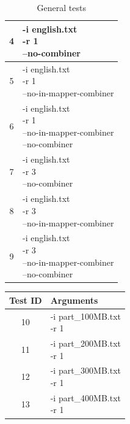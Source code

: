 \documentclass{article}
\begin{document}
\begin{multicols}{2}
\begin{table}[H]
\begin{tabular}{|c|l|}
            \hline
            4 & \makecell[l]{-i english.txt \\ -r 1 \\ --no-combiner} \\        
            \hline
            5 & \makecell[l]{-i english.txt \\ -r 1 \\ --no-in-mapper-combiner} \\        
            \hline
            6 & \makecell[l]{-i english.txt \\ -r 1 \\ --no-in-mapper-combiner \\ --no-combiner} \\        
            \hline
            7 & \makecell[l]{-i english.txt \\ -r 3 \\ --no-combiner} \\        
            \hline
            8 & \makecell[l]{-i english.txt \\ -r 3 \\ --no-in-mapper-combiner} \\        
            \hline
            9 & \makecell[l]{-i english.txt \\ -r 3 \\ --no-in-mapper-combiner \\ --no-combiner} \\        
            \hline
        \end{tabular}
        \caption{General tests}
        \label{tab:general_tests}
    \end{table}
    \begin{table}[H]
        \centering
        \begin{tabular}{|c|l|}
            \hline
            Test ID & Arguments \\
            \hline
            10 & \makecell[l]{-i part\_100MB.txt \\ -r 1} \\  
            \hline      
            11 & \makecell[l]{-i part\_200MB.txt \\ -r 1} \\  
            \hline      
            12 & \makecell[l]{-i part\_300MB.txt \\ -r 1} \\        
            \hline
            13 & \makecell[l]{-i part\_400MB.txt \\ -r 1} \\        
            \hline

\end{tabular}
\end{table}
\end{multicols}
\end{document}

